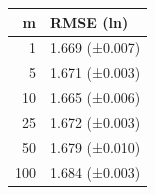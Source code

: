 \begin{tabular}{rl}
\toprule
m & RMSE (ln) \\
\midrule
1 & 1.669 (±0.007) \\
5 & 1.671 (±0.003) \\
10 & 1.665 (±0.006) \\
25 & 1.672 (±0.003) \\
50 & 1.679 (±0.010) \\
100 & 1.684 (±0.003) \\
\bottomrule
\end{tabular}
